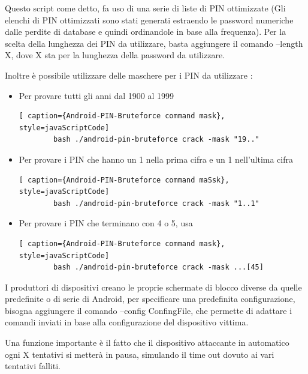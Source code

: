 Questo script come detto, fa uso di una serie di liste di PIN ottimizzate (Gli elenchi di PIN ottimizzati sono stati generati estraendo le password numeriche dalle perdite di database e quindi ordinandole in base alla frequenza). Per la scelta della lunghezza dei PIN da utilizzare, basta aggiungere il comando –length X, dove X sta per la lunghezza della password da utilizzare.

Inoltre è possibile utilizzare delle maschere per i PIN da utilizzare :
\begin{itemize}
	\item Per provare tutti gli anni dal 1900 al 1999 \newline
	\begin{lstlisting}[ caption={Android-PIN-Bruteforce command mask}, style=javaScriptCode]
		bash ./android-pin-bruteforce crack -mask "19.."
	\end{lstlisting}
	\item Per provare i PIN che hanno un 1 nella prima cifra e un 1 nell’ultima cifra \newline
	\begin{lstlisting}[ caption={Android-PIN-Bruteforce command maSsk}, style=javaScriptCode]
		bash ./android-pin-bruteforce crack -mask "1..1"
	\end{lstlisting}
	\item Per provare i PIN che terminano con 4 o 5, usa \newline
	\begin{lstlisting}[ caption={Android-PIN-Bruteforce command mask}, style=javaScriptCode]
		bash ./android-pin-bruteforce crack -mask ...[45]
	\end{lstlisting}
\end{itemize}

I produttori di dispositivi creano le proprie schermate di blocco diverse da quelle predefinite o di serie di Android, per specificare una predefinita configurazione, bisogna aggiungere il comando –config ConfingFile, che permette di adattare i comandi inviati in base alla configurazione del dispositivo vittima.

Una funzione importante è il fatto che il dispositivo attaccante in automatico ogni X tentativi si metterà in pausa, simulando il time out dovuto ai vari tentativi falliti.

